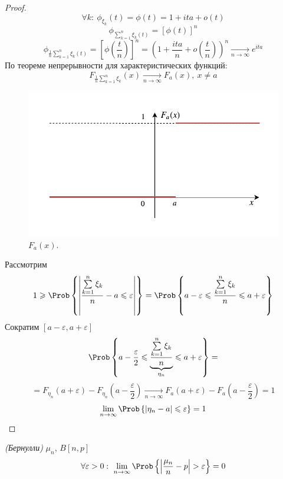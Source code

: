 \begin{proof}
	\[
		\forall k: \ \phi_{\xi_k} (t) = \phi (t) = 1 + it a + o(t)
	\]
	\[
		\phi_{\sum\limits_{k = 1}^{n} \xi_k (t)} = \left[ \phi(t) \right]^n
	\]
	\[
		\phi_{\frac{1}{n} \sum\limits_{k = 1}^{n} \xi_k (t)} = \left[ \phi(\frac{t}{n}) \right]^n = \left( 1 + \frac{it a}{n} + o(\frac{t}{n}) \right)^n \underset{n \to \infty}{\rightarrow} e^{it a}
	\]
	По теореме непрерывности для характеристических функций: %
	\[
		F_{\frac{1}{n} \sum\limits_{k = 1}^{n} \xi_k} (x) \underset{n \to \infty}{\rightarrow} F_a (x), \ x \neq a
	\]
	\begin{figure}[H]
	\begin{center}
	\includegraphics[width=\textwidth,height=\textheight,keepaspectratio]{fig/plot4-1.pdf}
	\end{center}
	\caption{$F_a(x)$.}
\end{figure}
	Рассмотрим
	\[
		1 \geqslant \Prob \left\{ \left| \frac{\sum\limits_{k = 1}^{n} \xi_k}{n} - a \leqslant \varepsilon \right| \right\} = \Prob \left\{ a - \varepsilon \leqslant \frac{\sum\limits_{k = 1}^{n} \xi_k}{n} \leqslant a + \varepsilon \right\}
	\]
	Сократим $[a - \varepsilon, a + \varepsilon]$
	\[
		\Prob \left\{ a - \frac{\varepsilon}{2} \leqslant \underbrace{\frac{\sum\limits_{k = 1}^{n} \xi_k}{n}}_{\eta_n} \leqslant a + \varepsilon \right\} =
	\]
	\[
		= F_{\eta_n} (a + \varepsilon) - F_{\eta_n} \left( a - \frac{\varepsilon}{2} \right) \underset{n \to \infty}{\rightarrow} F_a \left( a + \varepsilon \right) - F_a \left(a - \frac{\varepsilon}{2} \right) = 1
	\]
	\[
		\lim\limits_{n \to \infty} \Prob \left\{ | \eta_n - a | \leqslant \varepsilon \right\} = 1
	\]
\end{proof}
\begin{theorem}
	\textit{(Бернулли)} $\mu_n$, $B [n, p]$
	\[
		\forall \varepsilon > 0: \ \lim\limits_{n \to \infty} \Prob \left\{ \left| \frac{\mu_n}{n} - p \right| > \varepsilon \right\} = 0
	\]
\end{theorem}
